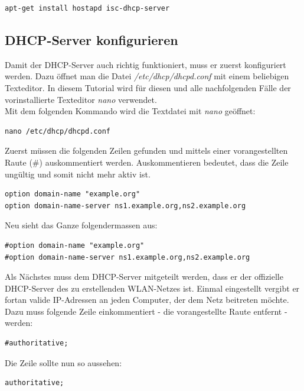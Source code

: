 \begin{lstlisting}
apt-get install hostapd isc-dhcp-server
\end{lstlisting}

\subsection{DHCP-Server konfigurieren}
Damit der DHCP-Server auch richtig funktioniert, muss er zuerst konfiguriert werden.
Dazu öffnet man die Datei \textit{/etc/dhcp/dhcpd.conf} mit einem beliebigen Texteditor. In diesem Tutorial wird für diesen und alle nachfolgenden Fälle der vorinstallierte Texteditor \textit{nano} verwendet.
\\
Mit dem folgenden Kommando wird die Textdatei mit \textit{nano} geöffnet:

\begin{lstlisting}
nano /etc/dhcp/dhcpd.conf
\end{lstlisting}

Zuerst müssen die folgenden Zeilen gefunden und mittels einer vorangestellten Raute (\#) auskommentiert werden. Auskommentieren bedeutet, dass die Zeile ungültig und somit nicht mehr aktiv ist.

\begin{lstlisting}
option domain-name "example.org"
option domain-name-server ns1.example.org,ns2.example.org
\end{lstlisting}

Neu sieht das Ganze folgendermassen aus:

\begin{lstlisting}
#option domain-name "example.org"
#option domain-name-server ns1.example.org,ns2.example.org
\end{lstlisting}

Als Nächstes muss dem DHCP-Server mitgeteilt werden, dass er der offizielle DHCP-Server des zu erstellenden WLAN-Netzes ist. Einmal eingestellt vergibt er fortan valide IP-Adressen an jeden Computer, der dem Netz beitreten möchte.
\\
Dazu muss folgende Zeile einkommentiert - die vorangestellte Raute entfernt - werden:

\begin{lstlisting}
#authoritative;
\end{lstlisting}

Die Zeile sollte nun so aussehen:

\begin{lstlisting}
authoritative;
\end{lstlisting}

